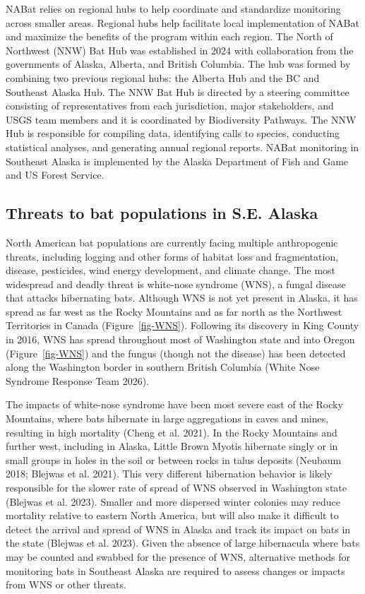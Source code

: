 \documentclass[
  letterpaper,
  DIV=11,
  numbers=noendperiod]{scrartcl}
\begin{document}
NABat relies on regional hubs to help coordinate and standardize
monitoring across smaller areas. Regional hubs help facilitate local
implementation of NABat and maximize the benefits of the program within
each region. The North of Northwest (NNW) Bat Hub was established in
2024 with collaboration from the governments of Alaska, Alberta, and
British Columbia. The hub was formed by combining two previous regional
hubs: the Alberta Hub and the BC and Southeast Alaska Hub. The NNW Bat
Hub is directed by a steering committee consisting of representatives
from each jurisdiction, major stakeholders, and USGS team members and it
is coordinated by Biodiversity Pathways. The NNW Hub is responsible for
compiling data, identifying calls to species, conducting statistical
analyses, and generating annual regional reports. NABat monitoring in
Southeast Alaska is implemented by the Alaska Department of Fish and
Game and US Forest Service.

\subsection{Threats to bat populations in S.E.
Alaska}\label{threats-to-bat-populations-in-s.e.-alaska}

North American bat populations are currently facing multiple
anthropogenic threats, including logging and other forms of habitat loss
and fragmentation, disease, pesticides, wind energy development, and
climate change. The most widespread and deadly threat is white-nose
syndrome (WNS), a fungal disease that attacks hibernating bats. Although
WNS is not yet present in Alaska, it has spread as far west as the Rocky
Mountains and as far north as the Northwest Territories in Canada
(Figure~\ref{fig-WNS}). Following its discovery in King County in 2016,
WNS has spread throughout most of Washington state and into Oregon
(Figure~\ref{fig-WNS}) and the fungus (though not the disease) has been
detected along the Washington border in southern British Columbia (White
Nose Syndrome Response Team 2026).

\hfill\break
The impacts of white-nose syndrome have been most severe east of the
Rocky Mountains, where bats hibernate in large aggregations in caves and
mines, resulting in high mortality (Cheng et al. 2021). In the Rocky
Mountains and further west, including in Alaska, Little Brown Myotis
hibernate singly or in small groups in holes in the soil or between
rocks in talus deposits (Neubaum 2018; Blejwas et al. 2021). This very
different hibernation behavior is likely responsible for the slower rate
of spread of WNS observed in Washington state (Blejwas et al. 2023).
Smaller and more dispersed winter colonies may reduce mortality relative
to eastern North America, but will also make it difficult to detect the
arrival and spread of WNS in Alaska and track its impact on bats in the
state (Blejwas et al. 2023). Given the absence of large hibernacula
where bats may be counted and swabbed for the presence of WNS,
alternative methods for monitoring bats in Southeast Alaska are required
to assess changes or impacts from WNS or other threats.
\end{document}
